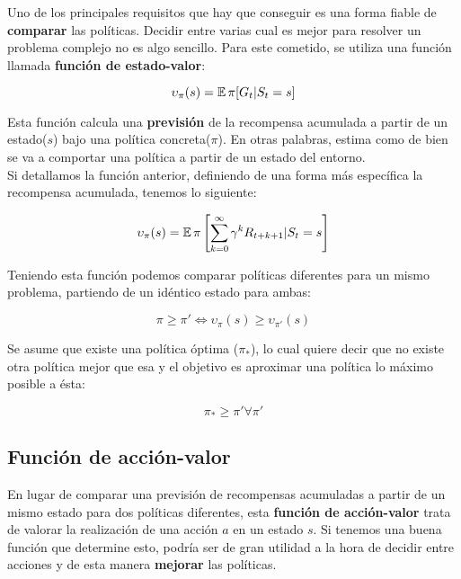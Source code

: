 \documentclass[11pt,fleqn]{book} %
\begin{document}
Uno de los principales requisitos que hay que conseguir es una forma fiable de \textbf{comparar} las políticas. Decidir entre varias cual es mejor para resolver un problema complejo no es algo sencillo. Para este cometido, se utiliza una función llamada \textbf{función de estado-valor}: 

\begin{equation*}
\upsilon_\pi(s)=\operatorname*{\mathbb{E}}\pi[G_t|S_t=s]
\end{equation*}

Esta función calcula una \textbf{previsión} de la recompensa acumulada a partir de un estado($s$) bajo una política concreta($\pi$). En otras palabras, estima como de bien se va a comportar una política a partir de un estado del entorno.\\

Si detallamos la función anterior, definiendo de una forma más específica la recompensa acumulada, tenemos lo siguiente:

\begin{equation*}
\upsilon_\pi(s)=\operatorname*{\mathbb{E}}\pi\left[\sum^\infty_{k=0}\gamma^kR_{t+k+1} | S_t=s\right]
\end{equation*}

Teniendo esta función podemos comparar políticas diferentes para un mismo problema, partiendo de un idéntico estado para ambas:

\begin{equation*}
\pi\geq\pi'\iff\upsilon_\pi(s)\geq\upsilon_{\pi'}(s) 
\end{equation*}

Se asume que existe una política óptima ($\pi_*$), lo cual quiere decir que no existe otra política mejor que esa y el objetivo es aproximar una política lo máximo posible a ésta:

\begin{equation*}
\pi_* \geq \pi' \forall \pi'
\end{equation*}

\subsection{Función de acción-valor}

En lugar de comparar una previsión de recompensas acumuladas a partir de un mismo estado para dos políticas diferentes, esta \textbf{función de acción-valor} trata de valorar la realización de una acción $a$ en un estado $s$. Si tenemos una buena función que determine esto, podría ser de gran utilidad a la hora de decidir entre acciones y de esta manera \textbf{mejorar} las políticas. \\
\end{document}
